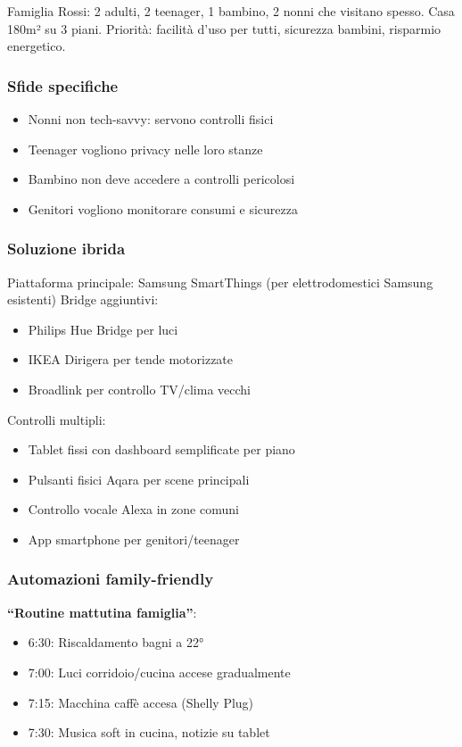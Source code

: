 Famiglia Rossi: 2 adulti, 2 teenager, 1 bambino, 2 nonni che visitano spesso. Casa 180m² su 3 piani. Priorità: facilità d'uso per tutti, sicurezza bambini, risparmio energetico.

\subsubsection{Sfide specifiche}

\begin{itemize}
    \item Nonni non tech-savvy: servono controlli fisici
    \item Teenager vogliono privacy nelle loro stanze
    \item Bambino non deve accedere a controlli pericolosi
    \item Genitori vogliono monitorare consumi e sicurezza
\end{itemize}

\subsubsection{Soluzione ibrida}

Piattaforma principale: Samsung SmartThings (per elettrodomestici Samsung esistenti)
Bridge aggiuntivi:
\begin{itemize}
    \item Philips Hue Bridge per luci
    \item IKEA Dirigera per tende motorizzate
    \item Broadlink per controllo TV/clima vecchi
\end{itemize}

Controlli multipli:
\begin{itemize}
    \item Tablet fissi con dashboard semplificate per piano
    \item Pulsanti fisici Aqara per scene principali
    \item Controllo vocale Alexa in zone comuni
    \item App smartphone per genitori/teenager
\end{itemize}

\subsubsection{Automazioni family-friendly}

\textbf{``Routine mattutina famiglia''}:
\begin{itemize}
    \item 6:30: Riscaldamento bagni a 22°
    \item 7:00: Luci corridoio/cucina accese gradualmente
    \item 7:15: Macchina caffè accesa (Shelly Plug)
    \item 7:30: Musica soft in cucina, notizie su tablet
\end{itemize}

